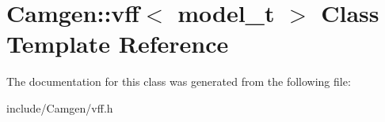 \hypertarget{a00567}{\section{Camgen\-:\-:vff$<$ model\-\_\-t $>$ Class Template Reference}
\label{a00567}
}


The documentation for this class was generated from the following file\-:\begin{DoxyCompactItemize}
\item 
include/\-Camgen/vff.\-h\end{DoxyCompactItemize}
